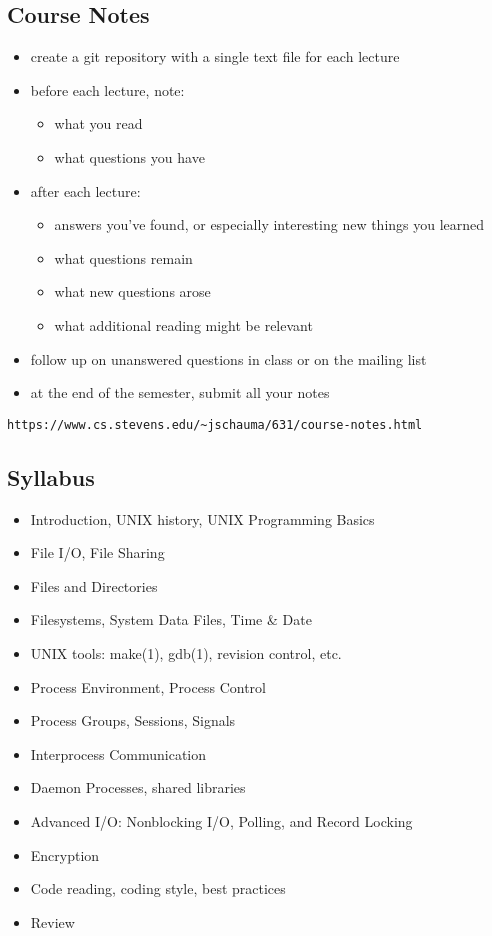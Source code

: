 \documentclass[sxga]{xdvislides}
\begin{document}
\subsection{Course Notes}
\begin{itemize}
	\item create a git repository with a single text file for each lecture
	\item before each lecture, note:
		\begin{itemize}
			\item what you read
			\item what questions you have
		\end{itemize}
	\item after each lecture:
		\begin{itemize}
			\item answers you've found, or especially interesting new things you learned
			\item what questions remain
			\item what new questions arose
			\item what additional reading might be relevant
		\end{itemize}
	\item follow up on unanswered questions in class or on the mailing list
	\item at the end of the semester, submit all your notes
\end{itemize}

\verb+https://www.cs.stevens.edu/~jschauma/631/course-notes.html+


\subsection{Syllabus}
\begin{itemize}
	\item Introduction, UNIX history, UNIX Programming Basics
	\item File I/O, File Sharing
	\item Files and Directories
	\item Filesystems, System Data Files, Time \& Date
	\item UNIX tools: make(1), gdb(1), revision control, etc.
	\item Process Environment, Process Control
	\item Process Groups, Sessions, Signals
	\item Interprocess Communication
	\item Daemon Processes, shared libraries
	\item Advanced I/O: Nonblocking I/O, Polling, and Record Locking
	\item Encryption
	\item Code reading, coding style, best practices
	\item Review
\end{itemize}
\end{document}
